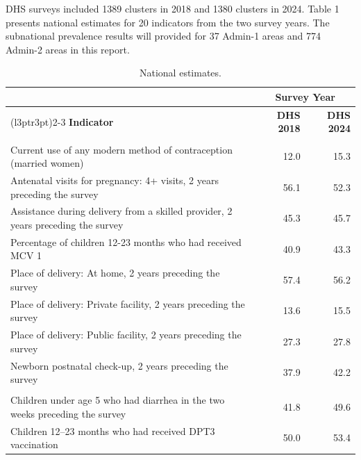 \documentclass[
]{article}
\begin{document}
DHS surveys included 1389 clusters in 2018 and 1380 clusters in 2024. Table 1 presents national estimates for 20 indicators from the two survey years. The subnational prevalence results will provided for 37 Admin-1 areas and 774 Admin-2 areas in this report.

\begin{table}[!h]
\centering
\caption{\label{tab:unnamed-chunk-7}National estimates.}
\centering
\begin{tabular}[t]{lrr}
\toprule
\multicolumn{1}{c}{ } & \multicolumn{2}{c}{Survey Year} \\
\cmidrule(l{3pt}r{3pt}){2-3}
\textbf{Indicator} & \textbf{DHS 2018} & \textbf{DHS 2024}\\
\midrule
\addlinespace[0.3em]
\multicolumn{3}{l}{\textbf{Maternal Health}}\\
\hspace{1em}Current use of any modern method of contraception (married women) & 12.0 & 15.3\\
\hspace{1em}Antenatal visits for pregnancy: 4+ visits, 2 years preceding the survey & 56.1 & 52.3\\
\hspace{1em}Assistance during delivery from a skilled provider, 2 years preceding the survey & 45.3 & 45.7\\
\hspace{1em}Percentage of children 12-23 months who had received MCV 1 & 40.9 & 43.3\\
\hspace{1em}Place of delivery: At home, 2 years preceding the survey & 57.4 & 56.2\\
\hspace{1em}Place of delivery: Private facility, 2 years preceding the survey & 13.6 & 15.5\\
\hspace{1em}Place of delivery: Public facility, 2 years preceding the survey & 27.3 & 27.8\\
\hspace{1em}Newborn postnatal check-up, 2 years preceding the survey & 37.9 & 42.2\\
\addlinespace[0.3em]
\multicolumn{3}{l}{\textbf{Child Health}}\\
\hspace{1em}Children under age 5 who had diarrhea in the two weeks preceding the survey & 41.8 & 49.6\\
\hspace{1em}Children 12–23 months who had received DPT3 vaccination & 50.0 & 53.4\\

\end{tabular}
\end{table}
\end{document}
